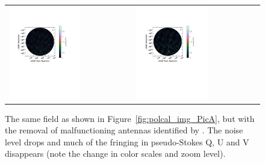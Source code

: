 \begin{figure}
\begin{tabular}{ll}
\includegraphics[clip, trim=0.5cm 11cm 4cm 5cm, width=0.6\textwidth]{chapters/polcal/figures/68380-U-better.pdf} &
\includegraphics[clip, trim=0.5cm 11cm 4cm 5cm, width=0.6\textwidth]{chapters/polcal/figures/68380-V-better.pdf} \\
\end{tabular}
\caption[The same field as shown in Figure~\ref{fig:polcal_img_PicA}, but with the removal of malfunctioning antennas identified by \cite{Kohn.16}.]{The same field as shown in Figure~\ref{fig:polcal_img_PicA}, but with the removal of malfunctioning antennas identified by \cite{Kohn.16}. The noise level drops and much of the fringing in pseudo-Stokes Q, U and V disappears (note the change in color scales and zoom level).}
\label{fig:polcal_img_PicA_improved}
\end{figure}


